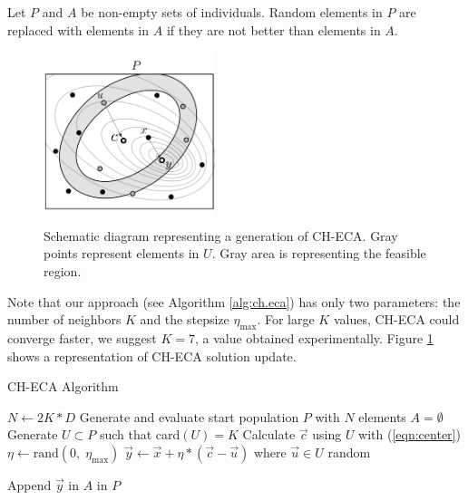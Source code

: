 \documentclass[conference]{IEEEtran}
\begin{document}
Let $P$ and $A$  be  non-empty sets of individuals. Random elements in $P$ are replaced with elements in $A$ if they are not better than elements in $A$.

\begin{figure}[!ht]
	\centering
	\includegraphics[width=5cm]{img/ecaG.pdf}
	\caption{Schematic diagram representing a generation of CH-ECA. Gray points %
	represent elements in $U$. Gray area is representing the feasible region.}
	\label{fig:ecag}       %
\end{figure}

Note that our approach (see Algorithm \ref{alg:ch.eca}) has only two parameters: the number of neighbors $K$ and  the stepsize $\eta_{\max}$.  For large $K$ values, CH-ECA could converge  faster, we suggest $K = 7$, a value obtained experimentally. Figure \ref{fig:ecag} shows a representation of CH-ECA solution update. 

\begin{algorithm}[!ht]
	\caption{CH-ECA Algorithm}
	\label{alg:ch.eca}
	\begin{algorithmic}[1]
 		\renewcommand{\algorithmicrequire}{\textbf{Input:}}
 		\renewcommand{\algorithmicensure}{\textbf{Output:}}
		\STATE $N \gets 2K * D$
		\STATE Generate and evaluate start population $P$ with $N$ elements
			\STATE $A = \emptyset$
				\STATE Generate $U \subset P$ such that  card$(U) = K$
				\STATE Calculate $\vec{c}$ using $U$ with (\ref{eqn:center})
				\STATE $\eta \gets \text{rand}(0,\; \eta_{\max}) $ 
				\STATE $\vec{y} \gets \vec{x} + \eta  * (\vec{c} - \vec{u}) $ where $ \vec{u} \in U $ random
				
					\STATE Append $\vec{y} $ in $A$
				\ENDIF
			\ENDFOR
		\ENDWHILE
		 in $P$
	\end{algorithmic}
\end{algorithm}
\end{document}
